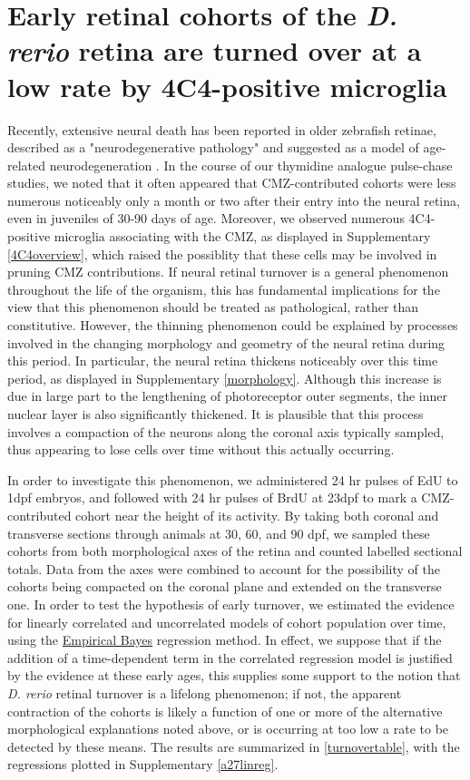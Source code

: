 \section{Early retinal cohorts of the \textit{D. rerio} retina are turned over at a low rate by 4C4-positive microglia}
\label{sec:neuralfate}
Recently, extensive neural death has been reported in older zebrafish retinae, described as a "neurodegenerative pathology" and suggested as a model of age-related neurodegeneration \cite{Vanhoucke2018}. In the course of our thymidine analogue pulse-chase studies, we noted that it often appeared that CMZ-contributed cohorts were less numerous noticeably only a month or two after their entry into the neural retina, even in juveniles of 30-90 days of age. Moreover, we observed numerous 4C4-positive microglia associating with the CMZ, as displayed in Supplementary \autoref{4C4overview}, which raised the possiblity that these cells may be involved in pruning CMZ contributions. If neural retinal turnover is a general phenomenon throughout the life of the organism, this has fundamental implications for the view that this phenomenon should be treated as pathological, rather than constitutive. However, the thinning phenomenon could be explained by processes involved in the changing morphology and geometry of the neural retina during this period. In particular, the neural retina thickens noticeably over this time period, as displayed in Supplementary \autoref{morphology}. Although this increase is due in large part to the lengthening of photoreceptor outer segments, the inner nuclear layer is also significantly thickened. It is plausible that this process involves a compaction of the neurons along the coronal axis typically sampled, thus appearing to lose cells over time without this actually occurring. 

In order to investigate this phenomenon, we administered 24 hr pulses of EdU to 1dpf embryos, and followed with 24 hr pulses of BrdU at 23dpf to mark a CMZ-contributed cohort near the height of its activity. By taking both coronal and transverse sections through animals at 30, 60, and 90 dpf, we sampled these cohorts from both morphological axes of the retina and counted labelled sectional totals. Data from the axes were combined to account for the possibility of the cohorts being compacted on the coronal plane and extended on the transverse one. In order to test the hypothesis of early turnover, we estimated the evidence for linearly correlated and uncorrelated models of cohort population over time, using the \hyperref[empiricalBayes]{Empirical Bayes} regression method. In effect, we suppose that if the addition of a time-dependent term in the correlated regression model is justified by the evidence at these early ages, this supplies some support to the notion that \textit{D. rerio} retinal turnover is a lifelong phenomenon; if not, the apparent contraction of the cohorts is likely a function of one or more of the alternative morphological explanations noted above, or is occurring at too low a rate to be detected by these means. The results are summarized in \autoref{turnovertable}, with the regressions plotted in Supplementary \autoref{a27linreg}.


